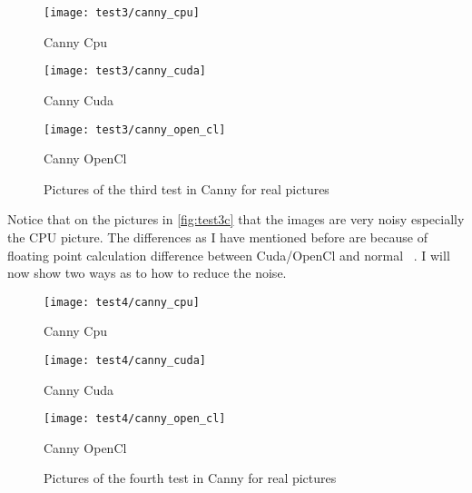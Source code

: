 \begin{figure}[H]
\centering
\begin{minipage}[t]{.325\textwidth}
\centering
\texttt{[image: test3/canny\_cpu]}
\addtocounter{figure}{-1}
\captionsetup{labelformat=empty}
\caption[]{Canny Cpu}
\end{minipage}
\begin{minipage}[t]{.325\textwidth}
\centering
\texttt{[image: test3/canny\_cuda]}
\addtocounter{figure}{-1}
\captionsetup{labelformat=empty}
\caption[]{Canny Cuda}
\end{minipage}
\begin{minipage}[t]{.325\textwidth}
\centering
\texttt{[image: test3/canny\_open\_cl]}
\addtocounter{figure}{-1}
\captionsetup{labelformat=empty}
\caption[]{Canny OpenCl}
\end{minipage}
\caption{Pictures of the third test in \ac{Canny} for real pictures}
\label{fig:test3c}
\end{figure}

Notice that on the pictures in \autoref{fig:test3c} that the images are very noisy especially the \ac{CPU} picture. The differences as I have mentioned before are because of floating point calculation difference between Cuda/OpenCl and normal \CC\ . I will now show two ways as to how to reduce the noise.

\begin{figure}[H]
\centering
\begin{minipage}[t]{.325\textwidth}
\centering
\texttt{[image: test4/canny\_cpu]}
\addtocounter{figure}{-1}
\captionsetup{labelformat=empty}
\caption[]{Canny Cpu}
\end{minipage}
\begin{minipage}[t]{.325\textwidth}
\centering
\texttt{[image: test4/canny\_cuda]}
\addtocounter{figure}{-1}
\captionsetup{labelformat=empty}
\caption[]{Canny Cuda}
\end{minipage}
\begin{minipage}[t]{.325\textwidth}
\centering
\texttt{[image: test4/canny\_open\_cl]}
\addtocounter{figure}{-1}
\captionsetup{labelformat=empty}
\caption[]{Canny OpenCl}
\end{minipage}
\caption{Pictures of the fourth test in \ac{Canny} for real pictures}
\label{fig:test4c}
\end{figure}

